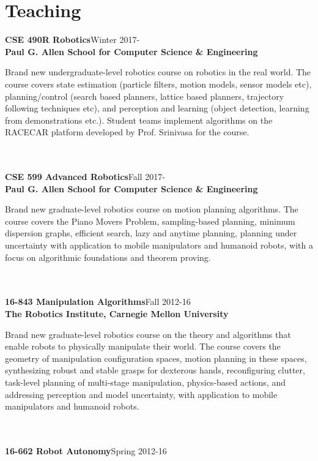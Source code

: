 
\section{Teaching}
\noindent
\textbf{CSE 490R Robotics}\hfill Winter 2017-\\
\textbf{Paul G. Allen School for Computer Science \& Engineering}\\
\parbox[t]{0.75\textwidth}{
Brand new undergraduate-level robotics course on robotics in the real world. The course covers state estimation (particle filters, motion models, sensor models etc), planning/control (search based planners, lattice based planners, trajectory following techniques etc), and perception and learning (object detection, learning from demonstrations etc.). Student teams implement algorithms on the RACECAR platform developed by Prof. Srinivasa for the course.
}\\
\\
\noindent
\textbf{CSE 599 Advanced Robotics}\hfill Fall 2017-\\
\textbf{Paul G. Allen School for Computer Science \& Engineering}\\
\parbox[t]{0.75\textwidth}{
Brand new graduate-level robotics course on motion planning algorithms. The course covers the Piano Movers Problem, sampling-based planning, minimum dispersion graphs, efficient search, lazy and anytime planning, planning under uncertainty with application to mobile manipulators and humanoid robots, with a focus on algorithmic foundations and theorem proving.
}\\
\\
\noindent
\textbf{16-843 Manipulation Algorithms}\hfill Fall 2012-16\\
\textbf{The Robotics Institute, Carnegie Mellon University}\\
\parbox[t]{0.75\textwidth}{
Brand new graduate-level robotics course on the theory and algorithms that enable robots to physically manipulate their world. The course covers the geometry of manipulation configuration spaces, motion planning in these spaces, synthesizing robust and stable grasps for dexterous hands, reconfiguring clutter, task-level planning of multi-stage manipulation, physics-based actions, and addressing perception and model uncertainty, with application to mobile manipulators and humanoid robots.
}\\
\\
\noindent
\textbf{16-662 Robot Autonomy}\hfill Spring 2012-16\\
